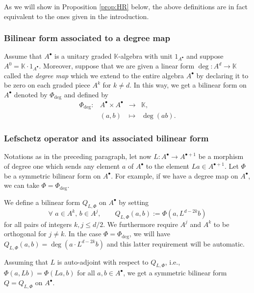 \documentclass[11pt]{amsart}
\theoremstyle{definition}
\newenvironment{remark}
  {\pushQED{\qed}\renewcommand{\qedsymbol}{$\diamond$}\remm}
  {\popQED\endremm}
\numberwithin{equation}{section}
\renewcommand{\~}{\widetilde}
\newcommand{\bul}{\bullet} %
\newcommand{\corps}{\mathbb K} %
\begin{document}
\begin{remark} As we will show in Proposition \ref{prop:HR} below, the above definitions are in fact equivalent to the ones given in the introduction.
\end{remark}


\subsubsection{Bilinear form associated to a degree map} Assume that $A^\bul$ is a unitary graded $\corps$-algebra with unit $1_{A^\bul}$ and suppose $A^0 = \corps \cdot 1_{A^\bul}$. Moreover, suppose that we are given a linear form $\deg\colon A^d \to \corps$ called the \emph{degree map} which we extend to the entire algebra $A^\bul$ by declaring it to be zero on each graded piece $A^k$ for $k\neq d$. In this way, we get a bilinear form on $A^\bul$ denoted by $\Phi_{\deg}$ and defined by
\[ \begin{array}{rccl}
  \Phi_{\deg} \colon & A^\bul \times A^\bul & \to & \corps, \\
  & (a, b) & \mapsto & \deg(ab).
\end{array} \]


\subsubsection{Lefschetz operator and its associated bilinear form}\label{sec:lefschetz} Notations as in the preceding paragraph, let now $L\colon A^\bul\to A^{\bul+1}$ be a morphism of degree one which sends any element $a$ of $A^\bul$ to the element $La\in A^{\bul+1}$. Let $\Phi$ be a symmetric bilinear form on $A^\bul$. For example, if we have a degree map on $A^\bul$, we can take $\Phi = \Phi_{\deg}$.

\medskip

We define a bilinear form $Q_{L,\Phi}$ on $A^\bul$ by setting
\[\forall\,\, a\in A^k,\, b\in A^j, \qquad Q_{L,\Phi}(a, b):=\Phi(a,L^{d-2k}b)\]
for all pairs of integers $k,j\leq d/2$. We furthermore require $A^j$ and $A^k$ to be orthogonal for $j\neq k$. In the case $\Phi = \Phi_{\deg}$, we will have $Q_{L,\Phi}(a, b) = \deg(a\cdot L^{d-2k}b)$ and this latter requirement will be automatic.

\medskip

Assuming that $L$ is auto-adjoint with respect to $Q_{L, \Phi}$, i.e., $\Phi(a,L b) = \Phi(La, b)$ for all $a,b \in A^\bul$, we get a symmetric bilinear form $Q = Q_{L, \Phi}$ on $A^\bul$.
\end{document}
